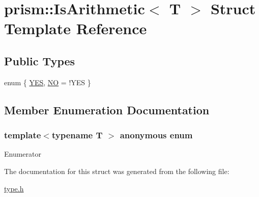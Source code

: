\hypertarget{structprism_1_1_is_arithmetic}{}\section{prism\+:\+:Is\+Arithmetic$<$ T $>$ Struct Template Reference}
\label{structprism_1_1_is_arithmetic}
\subsection*{Public Types}
\begin{DoxyCompactItemize}
\item 
enum \{ \hyperlink{structprism_1_1_is_arithmetic_affe3a81ae865663866cb1be2f372ef8fae60c79a2e333079e090eeb0c0d045029}{Y\+ES}, 
\hyperlink{structprism_1_1_is_arithmetic_affe3a81ae865663866cb1be2f372ef8fae0ab9925e6cb7a6c7fd80cad91649beb}{NO} = !\+Y\+ES
 \}
\end{DoxyCompactItemize}


\subsection{Member Enumeration Documentation}
\subsubsection[{\texorpdfstring{anonymous enum}{anonymous enum}}]{\setlength{\rightskip}{0pt plus 5cm}template$<$typename T $>$ anonymous enum}\hypertarget{structprism_1_1_is_arithmetic_affe3a81ae865663866cb1be2f372ef8f}{}\label{structprism_1_1_is_arithmetic_affe3a81ae865663866cb1be2f372ef8f}
\begin{Desc}
\item[Enumerator]\par
\begin{description}
\item[{\em 
Y\+ES\hypertarget{structprism_1_1_is_arithmetic_affe3a81ae865663866cb1be2f372ef8fae60c79a2e333079e090eeb0c0d045029}{}\label{structprism_1_1_is_arithmetic_affe3a81ae865663866cb1be2f372ef8fae60c79a2e333079e090eeb0c0d045029}
}]\item[{\em 
NO\hypertarget{structprism_1_1_is_arithmetic_affe3a81ae865663866cb1be2f372ef8fae0ab9925e6cb7a6c7fd80cad91649beb}{}\label{structprism_1_1_is_arithmetic_affe3a81ae865663866cb1be2f372ef8fae0ab9925e6cb7a6c7fd80cad91649beb}
}]\end{description}
\end{Desc}


The documentation for this struct was generated from the following file\+:\begin{DoxyCompactItemize}
\item 
\hyperlink{type_8h}{type.\+h}\end{DoxyCompactItemize}
